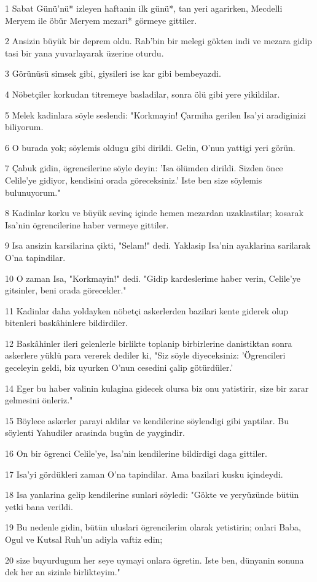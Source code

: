 \par 1 Sabat Günü'nü* izleyen haftanin ilk günü*, tan yeri agarirken, Mecdelli Meryem ile öbür Meryem mezari* görmeye gittiler.
\par 2 Ansizin büyük bir deprem oldu. Rab'bin bir melegi gökten indi ve mezara gidip tasi bir yana yuvarlayarak üzerine oturdu.
\par 3 Görünüsü simsek gibi, giysileri ise kar gibi bembeyazdi.
\par 4 Nöbetçiler korkudan titremeye basladilar, sonra ölü gibi yere yikildilar.
\par 5 Melek kadinlara söyle seslendi: "Korkmayin! Çarmiha gerilen Isa'yi aradiginizi biliyorum.
\par 6 O burada yok; söylemis oldugu gibi dirildi. Gelin, O'nun yattigi yeri görün.
\par 7 Çabuk gidin, ögrencilerine söyle deyin: 'Isa ölümden dirildi. Sizden önce Celile'ye gidiyor, kendisini orada göreceksiniz.' Iste ben size söylemis bulunuyorum."
\par 8 Kadinlar korku ve büyük sevinç içinde hemen mezardan uzaklastilar; kosarak Isa'nin ögrencilerine haber vermeye gittiler.
\par 9 Isa ansizin karsilarina çikti, "Selam!" dedi. Yaklasip Isa'nin ayaklarina sarilarak O'na tapindilar.
\par 10 O zaman Isa, "Korkmayin!" dedi. "Gidip kardeslerime haber verin, Celile'ye gitsinler, beni orada görecekler."
\par 11 Kadinlar daha yoldayken nöbetçi askerlerden bazilari kente giderek olup bitenleri baskâhinlere bildirdiler.
\par 12 Baskâhinler ileri gelenlerle birlikte toplanip birbirlerine danistiktan sonra askerlere yüklü para vererek dediler ki, "Siz söyle diyeceksiniz: 'Ögrencileri geceleyin geldi, biz uyurken O'nun cesedini çalip götürdüler.'
\par 14 Eger bu haber valinin kulagina gidecek olursa biz onu yatistirir, size bir zarar gelmesini önleriz."
\par 15 Böylece askerler parayi aldilar ve kendilerine söylendigi gibi yaptilar. Bu söylenti Yahudiler arasinda bugün de yaygindir.
\par 16 On bir ögrenci Celile'ye, Isa'nin kendilerine bildirdigi daga gittiler.
\par 17 Isa'yi gördükleri zaman O'na tapindilar. Ama bazilari kusku içindeydi.
\par 18 Isa yanlarina gelip kendilerine sunlari söyledi: "Gökte ve yeryüzünde bütün yetki bana verildi.
\par 19 Bu nedenle gidin, bütün uluslari ögrencilerim olarak yetistirin; onlari Baba, Ogul ve Kutsal Ruh'un adiyla vaftiz edin;
\par 20 size buyurdugum her seye uymayi onlara ögretin. Iste ben, dünyanin sonuna dek her an sizinle birlikteyim."


